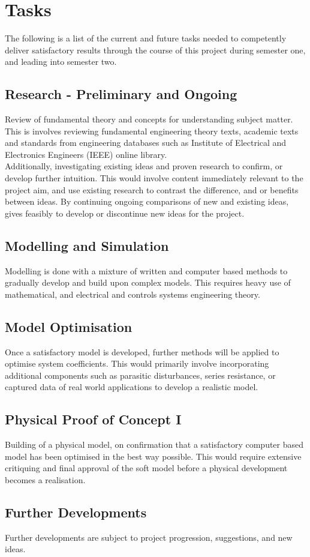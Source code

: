 \chapter{Tasks}
The following is a list of the current and future tasks needed to competently deliver satisfactory results through the course of this project during semester one, and leading into semester two.
\section{Research - Preliminary and Ongoing}
Review of fundamental theory and concepts for understanding subject matter. This is involves reviewing fundamental engineering theory texts, academic texts and standards from engineering databases such as Institute of Electrical and Electronics Engineers (IEEE) online library.\\
Additionally, investigating existing ideas and proven research to confirm, or develop further intuition. This would involve content immediately relevant to the project aim, and use existing research to contrast the difference, and or benefits between ideas. By continuing ongoing comparisons of new and existing ideas, gives feasibly to develop or discontinue new ideas for the project.
\section{Modelling and Simulation}
Modelling is done with a mixture of written and computer based methods to gradually develop and build upon complex models. This requires heavy use of mathematical, and electrical and controls systems engineering theory.
\section{Model Optimisation}
Once a satisfactory model is developed, further methods will be applied to optimise system coefficients. This would primarily involve incorporating additional components such as parasitic disturbances, series resistance, or captured data of real world applications to develop a realistic model.
\section{Physical Proof of Concept I}
Building of a physical model, on confirmation that a satisfactory computer based model has been optimised in the best way possible. This would require extensive critiquing and final approval of the soft model before a physical development becomes a realisation.
\section{Further Developments}
Further developments are subject to project progression, suggestions, and new ideas.
